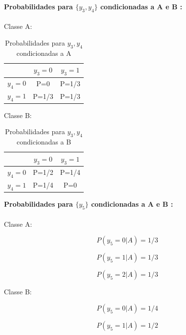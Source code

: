 \documentclass[a4paper,12pt]{article} %
\begin{document}
\begin{enumerate}
\begin{enumerate}
\textbf{Probabilidades para $\{y_3,y_4\}$ condicionadas a A e B :}
\\ \\
Classe A:
\begin{table}[H]
\centering
\begin{tabular}{c|c|c|} 
    \cline{2-3}
                                 & $y_3=0$ & $y_3=1$ \\ \hline
    \multicolumn{1}{|c|}{$y_4=0$} & P=0    & P=1/3  \\ \hline
    \multicolumn{1}{|c|}{$y_4=1$} & P=1/3  & P=1/3  \\ \hline
    \end{tabular}
    \caption{Probabilidades para ${y_3,y_4}$ condicionadas a A}
\end{table}

Classe B:

\begin{table}[H]
    \centering
    \begin{tabular}{c|c|c|} 
        \cline{2-3}
                                     & $y_3=0$ & $y_3=1$ \\ \hline
        \multicolumn{1}{|c|}{$y_4=0$} & P=1/2    & P=1/4  \\ \hline
        \multicolumn{1}{|c|}{$y_4=1$} & P=1/4  & P=0  \\ \hline
        \end{tabular}
        \caption{Probabilidades para ${y_3,y_4}$ condicionadas a B}
    \end{table}

\textbf{Probabilidades para $\{y_5\}$ condicionadas a A e B :}
\\ \\
Classe A:

\begin{equation*}
    P(y_5=0|A) = 1/3
\end{equation*}

\begin{equation*}
    P(y_5=1|A) = 1/3
\end{equation*}

\begin{equation*}
    P(y_5=2|A) = 1/3
\end{equation*}

Classe B:

\begin{equation*}
    P(y_5=0|A) = 1/4
\end{equation*}

\begin{equation*}
    P(y_5=1|A) = 1/2
\end{equation*}


\end{enumerate}
\end{enumerate}
\end{document}
